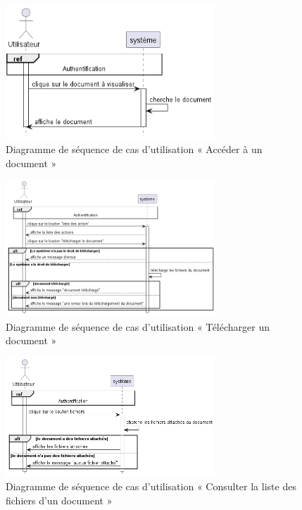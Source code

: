 \begin{figure}[H]
  \centering
  \includegraphics[width=0.7\textwidth]{out/diagrams/documents/preview/preview_document}
  \caption{Diagramme de séquence de cas d'utilisation « Accéder à un document  »}
  \label{fig:sequence_Accederaundocument}
\end{figure}
\begin{figure}[H]
  \centering
  \includegraphics[width=0.7\textwidth]{out/diagrams/documents/download/download}
  \caption{Diagramme de séquence de cas d'utilisation « Télécharger un document  »}
  \label{fig:sequence_telechargerundocument}
\end{figure}
\begin{figure}[H]
  \centering
  \includegraphics[width=0.7\textwidth]{out/diagrams/documents/previewFiles/preview_files_document}
  \caption{Diagramme de séquence de cas d'utilisation « Consulter la liste des fichiers d'un document  »}
  \label{fig:sequence_previewFiles}
\end{figure}
